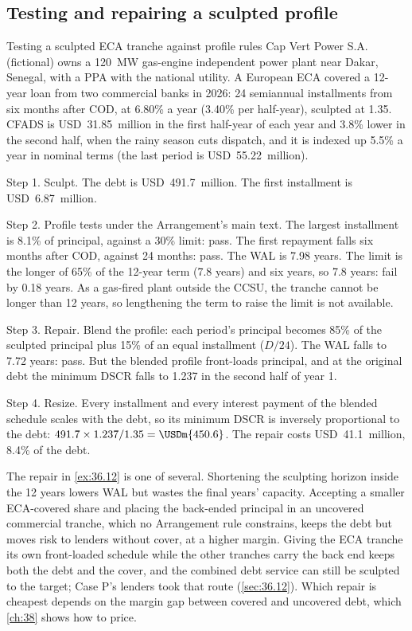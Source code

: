 \subsection{Testing and repairing a sculpted profile}\label{ssec:36.9.2}

\begin{example}{Testing a sculpted ECA tranche against profile rules \illustrative}\label{ex:36.12}
Cap Vert Power S.A. (fictional) owns a 120~MW gas-engine independent power plant near Dakar, Senegal, with a PPA with the national utility. A European ECA covered a 12-year loan from two commercial banks in 2026: 24 semiannual installments from six months after COD, at 6.80\% a year (3.40\% per half-year), sculpted at 1.35\x. CFADS is USD~31.85~million in the first half-year of each year and 3.8\% lower in the second half, when the rainy season cuts dispatch, and it is indexed up 5.5\% a year in nominal terms (the last period is USD~55.22~million).

Step 1. Sculpt. The debt is USD~491.7~million. The first installment is USD~6.87~million.

Step 2. Profile tests under the Arrangement's main text. The largest installment is 8.1\% of principal, against a 30\% limit: pass. The first repayment falls six months after COD, against 24 months: pass. The WAL is 7.98 years. The limit is the longer of 65\% of the 12-year term (7.8 years) and six years, so 7.8 years: fail by 0.18 years. As a gas-fired plant outside the CCSU, the tranche cannot be longer than 12 years, so lengthening the term to raise the limit is not available.

Step 3. Repair. Blend the profile: each period's principal becomes 85\% of the sculpted principal plus 15\% of an equal installment ($D/24$). The WAL falls to 7.72 years: pass. But the blended profile front-loads principal, and at the original debt the minimum DSCR falls to 1.237\x{} in the second half of year 1.

Step 4. Resize. Every installment and every interest payment of the blended schedule scales with the debt, so its minimum DSCR is inversely proportional to the debt: $491.7 \times 1.237/1.35 = \USDm{450.6}$. The repair costs USD~41.1~million, 8.4\% of the debt.
\end{example}

The repair in \cref{ex:36.12} is one of several. Shortening the sculpting horizon inside the 12 years lowers WAL but wastes the final years' capacity. Accepting a smaller ECA-covered share and placing the back-ended principal in an uncovered commercial tranche, which no Arrangement rule constrains, keeps the debt but moves risk to lenders without cover, at a higher margin. Giving the ECA tranche its own front-loaded schedule while the other tranches carry the back end keeps both the debt and the cover, and the combined debt service can still be sculpted to the target; Case P's lenders took that route (\cref{sec:36.12}). Which repair is cheapest depends on the margin gap between covered and uncovered debt, which \cref{ch:38} shows how to price.

